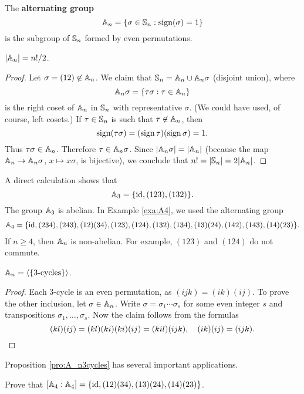The \textbf{alternating group}
\[
\mathbb{A}_n=\{\sigma\in\mathbb{S}_n:\operatorname{sign}(\sigma)=1\}
\]
is the subgroup of $\mathbb{S}_n$ formed by even permutations. 

\begin{proposition}
$|\mathbb{A}_n|=n!/2$.
\end{proposition}

\begin{proof}
Let $\sigma=(12)\not\in\mathbb{A}_n$. We claim that 
$\mathbb{S}_n=\mathbb{A}_n\cup\mathbb{A}_n\sigma$ (disjoint union), where 
\[
\mathbb{A}_n\sigma=\{\tau\sigma:\tau\in\mathbb{A}_n\}
\]
is the right coset of $\mathbb{A}_n$ in $\mathbb{S}_n$ with 
representative $\sigma$. (We could have used, of course, left cosets.)
If 
$\tau\in\mathbb{S}_n$ is such that $\tau\not\in\mathbb{A}_n$, then 
\[
\operatorname{sign}(\tau\sigma)=(\operatorname{sign}\tau)(\operatorname{sign}\sigma)=1.
\]
Thus 
$\tau\sigma\in\mathbb{A}_n$. Therefore $\tau\in\mathbb{A}_n\sigma$. Since  $|\mathbb{A}_n\sigma|=|\mathbb{A}_
n|$ (because the map $\mathbb{A}_n\to\mathbb{A}_n\sigma$, $x\mapsto x\sigma$, is bijective), we conclude that 
$n!=|\mathbb{S}_n|=2|\mathbb{A}_n|$.
\end{proof}

A direct calculation shows that  
\[
\mathbb{A}_3=\{\operatorname{id},(123),(132)\}.
\]
The group $\mathbb{A}_3$ is abelian.
In Example \ref{exa:A4}, we used the alternating group 
\begin{multline*}
\mathbb{A}_4=\{\operatorname{id},(234),(243),(12)(34),(123),(124),(132),(134),(13)(24),(142),(143),(14)(23)\}.
\end{multline*}
If $n\geq4$, then $\mathbb{A}_n$ is non-abelian. For example, 
$(123)$ and $(124)$ do not commute. 

\begin{proposition}
\label{pro:A_n3cycles}
$\mathbb{A}_n=\langle\{\text{3-cycles}\}\rangle$.
\end{proposition}

\begin{proof}
Each 3-cycle is an even permutation, as $(ijk)=(ik)(ij)$. 
To prove the other inclusion, let $\sigma\in\mathbb{A}_n$.
Write $\sigma=\sigma_1\cdots\sigma_s$ for some even integer $s$ 
and transpositions $\sigma_1,\dots,\sigma_s$. 
Now the claim follows from the formulas 
\[
(kl)(ij)=(kl)(ki)(ki)(ij)=(kil)(ijk),\quad
(ik)(ij)=(ijk).\qedhere
\]
 \end{proof}

Proposition \ref{pro:A_n3cycles} has several 
important applications. 

\begin{exercise}
\label{xca:commutator_A4}
    Prove that $[\mathbb{A}_4:\mathbb{A}_4]=\{\operatorname{id},(12)(34),(13)(24),(14)(23)\}$. 
\end{exercise}

